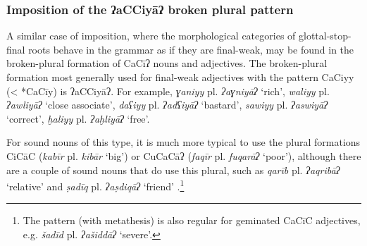\documentclass[output=paper]{langsci/langscibook}
\begin{document}
\subsubsection{\label{bkm:Ref13224796}Imposition of the ʔaCCiyāʔ broken plural pattern}

A similar case of {imposition}, where the morphological categories of glottal-stop-final {roots} behave in the grammar as if they are final-weak, may be found in the broken-plural {formation} of CaCīʔ nouns and adjectives. The broken-plural {formation} most generally used for final-weak adjectives with the pattern CaCiyy (< *CaCīy) is ʔaCCiyāʔ. For example, \textit{ɣaniyy} pl. \textit{ʔaɣniyāʔ} ‘rich’, \textit{waliyy} pl. \textit{ʔawliyāʔ} ‘close associate’, \textit{daʕiyy} pl. \textit{ʔadʕiyāʔ} ‘bastard’, \textit{sawiyy} pl. \textit{ʔaswiyāʔ} ‘correct’, \textit{ḫaliyy} pl. \textit{ʔaḫliyāʔ} ‘free’.

For sound nouns of this type, it is much more typical to use the plural formations CiCāC (\textit{kabīr} pl. \textit{kibār} ‘big’) or CuCaCāʔ (\textit{faqīr} pl. \textit{fuqarāʔ} ‘poor’), although there are a couple of sound nouns that do use this plural, such as \textit{qarīb} pl. \textit{ʔaqribāʔ} ‘{relative}’ and \textit{ṣadīq} pl. \textit{ʔaṣdiqāʔ} ‘friend’ \citep[106--107]{Ratcliffe1998}.\footnote{The pattern (with metathesis) is also regular for geminated CaCīC adjectives, e.g. \textit{šadīd}  pl. \textit{ʔašiddāʔ} ‘severe’.}
\end{document}
